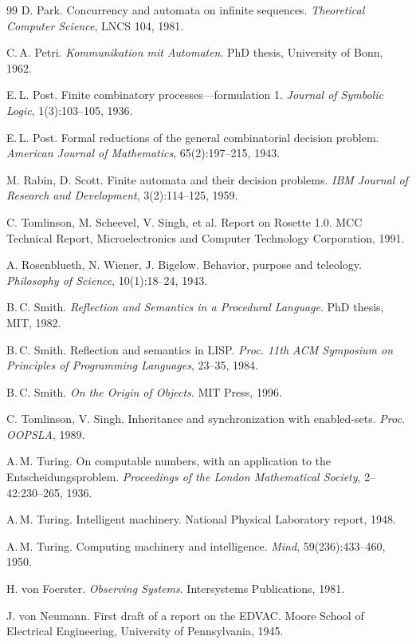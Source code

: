 \documentclass[11pt,a4paper]{article}
\begin{document}
\begin{thebibliography}{99}
 D. Park. Concurrency and automata on infinite sequences.
\emph{Theoretical Computer Science}, LNCS 104, 1981.

 C.\,A. Petri. \emph{Kommunikation mit Automaten}. PhD thesis,
University of Bonn, 1962.

 E.\,L. Post. Finite combinatory processes---formulation 1.
\emph{Journal of Symbolic Logic}, 1(3):103--105, 1936.

 E.\,L. Post. Formal reductions of the general combinatorial
decision problem. \emph{American Journal of Mathematics}, 65(2):197--215, 1943.

 M. Rabin, D. Scott. Finite automata and their decision
problems. \emph{IBM Journal of Research and Development}, 3(2):114--125, 1959.

 C. Tomlinson, M. Scheevel, V. Singh, et al. Report on
Rosette 1.0. MCC Technical Report, Microelectronics and Computer Technology
Corporation, 1991.

 A. Rosenblueth, N. Wiener, J. Bigelow. Behavior, purpose and
teleology. \emph{Philosophy of Science}, 10(1):18--24, 1943.

 B.\,C. Smith. \emph{Reflection and Semantics in a Procedural
Language}. PhD thesis, MIT, 1982.

 B.\,C. Smith. Reflection and semantics in LISP. \emph{Proc.
11th ACM Symposium on Principles of Programming Languages}, 23--35, 1984.

 B.\,C. Smith. \emph{On the Origin of Objects}. MIT Press, 1996.

 C. Tomlinson, V. Singh. Inheritance and synchronization
with enabled-sets. \emph{Proc. OOPSLA}, 1989.

 A.\,M. Turing. On computable numbers, with an application to
the Entscheidungsproblem. \emph{Proceedings of the London Mathematical Society},
2--42:230--265, 1936.

 A.\,M. Turing. Intelligent machinery. National Physical
Laboratory report, 1948.

 A.\,M. Turing. Computing machinery and intelligence.
\emph{Mind}, 59(236):433--460, 1950.

 H. von Foerster. \emph{Observing Systems}. Intersystems
Publications, 1981.

 J. von Neumann. First draft of a report on the EDVAC.
Moore School of Electrical Engineering, University of Pennsylvania, 1945.


\end{thebibliography}
\end{document}
